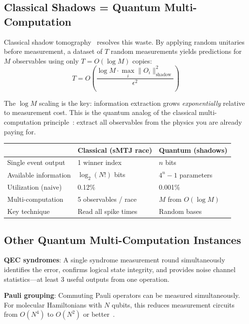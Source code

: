 \documentclass[11pt]{article}
\begin{document}
\subsection{Classical Shadows = Quantum Multi-Computation}

Classical shadow tomography~\cite{shadows} resolves this waste. By applying random unitaries before measurement, a dataset of $T$ random measurements yields predictions for $M$ observables using only $T = O(\log M)$ copies:
\begin{equation}
T = O\!\left(\frac{\log M \cdot \max_i \|O_i\|^2_{\text{shadow}}}{\epsilon^2}\right)
\end{equation}

The $\log M$ scaling is the key: information extraction grows \textit{exponentially} relative to measurement cost. This is the quantum analog of the classical multi-computation principle~\cite{bieg_multi}: extract all observables from the physics you are already paying for.

\begin{center}
\begin{tabular}{lll}
\toprule
& Classical (sMTJ race) & Quantum (shadows) \\
\midrule
Single event output & 1 winner index & $n$ bits \\
Available information & $\log_2(N!)$ bits & $4^n - 1$ parameters \\
Utilization (naive) & 0.12\% & 0.001\% \\
Multi-computation & 5 observables / race & $M$ from $O(\log M)$ \\
Key technique & Read all spike times & Random bases \\
\bottomrule
\end{tabular}
\end{center}

\subsection{Other Quantum Multi-Computation Instances}

\textbf{QEC syndromes}: A single syndrome measurement round simultaneously identifies the error, confirms logical state integrity, and provides noise channel statistics---at least 3 useful outputs from one operation.

\textbf{Pauli grouping}: Commuting Pauli operators can be measured simultaneously. For molecular Hamiltonians with $N$ qubits, this reduces measurement circuits from $O(N^4)$ to $O(N^2)$ or better~\cite{pauli_grouping}.
\end{document}
